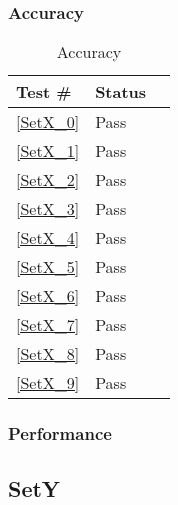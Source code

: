 \documentclass[12pt]{article}
\begin{document}
	\subsubsection{Accuracy}
		\begin{table}[H]
		\centering
		\caption{Accuracy}\label{GetY_acc}
		\begin{tabular}{lll}
		\toprule
		\bf Test \# & Status \\\midrule
		\ref{SetX_0} & Pass\\
		\ref{SetX_1} & Pass\\
		\ref{SetX_2} & Pass\\
		\ref{SetX_3} & Pass\\
		\ref{SetX_4} & Pass\\
		\ref{SetX_5} & Pass\\
		\ref{SetX_6} & Pass\\
		\ref{SetX_7} & Pass\\
		\ref{SetX_8} & Pass\\
		\ref{SetX_9} & Pass\\
		\bottomrule
		\end{tabular}
		\end{table}
	\subsubsection{Performance}

\subsection{SetY} %
\end{document}
